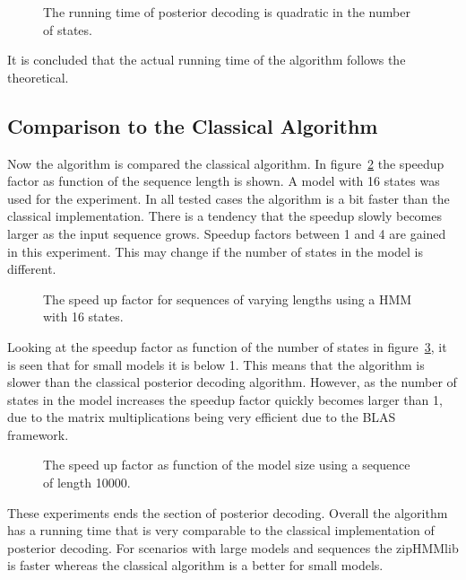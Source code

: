 \begin{figure}
  \centering
  
  \caption{The running time of posterior decoding is quadratic in the number of
    states.}
  \label{fig:posterior_k}
\end{figure}

It is concluded that the actual running time of the algorithm follows the
theoretical.

\subsection{Comparison to the Classical Algorithm}

Now the algorithm is compared the classical algorithm. In
figure~\ref{fig:posterior_speedup_vs_sequence_length} the speedup factor as
function of the sequence length is shown. A model with 16 states was used for
the experiment. In all tested cases the algorithm is a bit faster than the
classical implementation. There is a tendency that the speedup slowly becomes
larger as the input sequence grows. Speedup factors between 1 and 4 are gained
in this experiment. This may change if the number of states in the model is
different.

\begin{figure}
  \centering
  
  \caption{The speed up factor for sequences of varying lengths using a HMM
    with 16 states.}
  \label{fig:posterior_speedup_vs_sequence_length}
\end{figure}

Looking at the speedup factor as function of the number of states in
figure~\ref{fig:posterior_speedup_vs_k}, it is seen that for small models it is
below 1. This means that the algorithm is slower than the classical posterior
decoding algorithm. However, as the number of states in the model increases the
speedup factor quickly becomes larger than 1, due to the matrix multiplications
being very efficient due to the BLAS framework.

\begin{figure}
  \centering
  
  \caption{The speed up factor as function of the model size using a sequence
    of length 10000.}
  \label{fig:posterior_speedup_vs_k}
\end{figure}

These experiments ends the section of posterior decoding. Overall the algorithm
has a running time that is very comparable to the classical implementation of
posterior decoding. For scenarios with large models and sequences the zipHMMlib
is faster whereas the classical algorithm is a better for small models.


